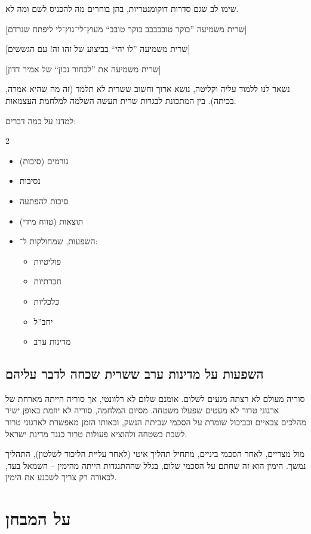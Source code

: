 \documentclass[]{../../../../tex/classes/styledArticle}
\begin{document}
	שימו לב שגם סדרות דוקומנטריות, בהן בוחרים מה להכניס לשם ומה לא. 
	
	[שרית משמיעה ''בוקר טובבבבב בוקר טובב`` מעוץ־לי־גוץ־לי ליפתח שנרדם]
	
	[שרית משמיעה ''לו יהי`` בביצוע של זהו זה! עם הגששים]
	
	[שרית משמיעה את ''לבחור נכון`` של אמיר דדון]
	
	נשאר לנו ללמוד עליה וקליטה, נושא ארוך וחשוב ששרית לא תלמד (זה מה שהיא אמרה, בכיתה). בין המתכונת לבגרות שרית תעשה השלמה למלחמת העצמאות. 
	
	למדנו על כמה דברים: 
	\begin{multicols}{2}
		\begin{itemize}
			\item גורמים (סיבות)
			\item נסיבות
			\item סיבות להפתעה
			\item תוצאות (טווח מידי)
			\item השפעות, שמחולקות ל־: 
			\begin{itemize}
				\item פוליטיות
				\item חברתיות
				\item כלכליות
				\item יחב''ל
				\item מדינות ערב
			\end{itemize}
		\end{itemize}
	\end{multicols}
	
	\subsection*{השפעות על מדינות ערב ששרית שכחה לדבר עליהם}
	סוריה מעולם לא רצתה מגעים לשלום. אומנם שלום לא רלוונטי, אך סוריה הייתה מארחת של ארגוני טרור לא מעטים שפעלו משטחה. מסיום המלחמה, סוריה לא יוזמת באופן ישיר מהלכים צבאיים וכביכול שומרת על הסכמי שביתת הנשק, ובאותו הזמן מאפשרת לארגוני טרור לשבת בשטחה ולהוציא פעולות טרור כנגד מדינת ישראל. 
	
	מול מצריים, לאחר הסכמי ביניים, מתחיל תהליך איטי (לאחר עליית הליכוד לשלטון), התהליך נמשך. הימין הוא זה שחתם על הסכמי שלום, בגלל שההתנגדות הייתה מהימין – השמאל בעד, לכאורה רק צריך לשכנע את הימין. 
	
	\section*{על המבחן}
	
\end{document}
